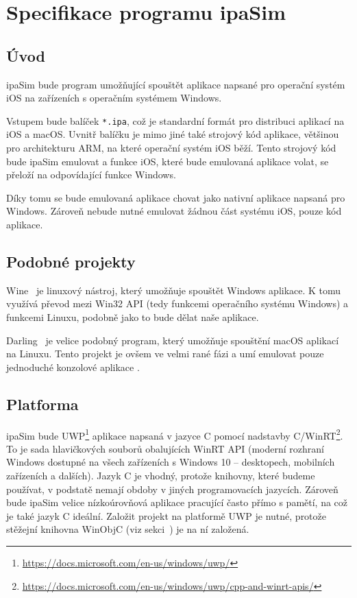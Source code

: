 \documentclass[12pt]{article}
\newcommand{\Rplus}{\protect\hspace{-.1em}\protect\raisebox{.35ex}{\smaller{\smaller\textbf{+}}}}
\newcommand{\Cpp}{\mbox{C\Rplus\Rplus}\xspace}
\begin{document}
\section*{Specifikace programu ipaSim}

\subsection*{Úvod}

ipaSim bude program umožňující spouštět aplikace napsané pro operační systém iOS na zařízeních s operačním systémem Windows.

Vstupem bude balíček \texttt{*.ipa}, což je standardní formát pro distribuci aplikací na iOS a macOS.
Uvnitř balíčku je mimo jiné také strojový kód aplikace, většinou pro architekturu ARM, na které operační systém iOS běží.
Tento strojový kód bude ipaSim emulovat a funkce iOS, které bude emulovaná aplikace volat, se přeloží na odpovídající funkce Windows.

Díky tomu se bude emulovaná aplikace chovat jako nativní aplikace napsaná pro Windows.
Zároveň nebude nutné emulovat žádnou část systému iOS, pouze kód aplikace.

\subsection*{Podobné projekty}

Wine~\cite{wine} je linuxový nástroj, který umožňuje spouštět Windows aplikace.
K tomu využívá převod mezi Win32 API (tedy funkcemi operačního systému Windows) a funkcemi Linuxu, podobně jako to bude dělat naše aplikace.

Darling~\cite{darling} je velice podobný program, který umožňuje spouštění macOS aplikací na Linuxu.
Tento projekt je ovšem ve velmi rané fázi a umí emulovat pouze jednoduché konzolové aplikace \cite{darlingStatus}.

\subsection*{Platforma}

ipaSim bude UWP\footnote{\url{https://docs.microsoft.com/en-us/windows/uwp/}} aplikace napsaná v jazyce \Cpp pomocí nadstavby \Cpp/WinRT\footnote{\url{https://docs.microsoft.com/en-us/windows/uwp/cpp-and-winrt-apis/}}.
To je sada hlavičkových souborů obalujících WinRT API (moderní rozhraní Windows dostupné na všech zařízeních s Windows 10 -- desktopech, mobilních zařízeních a dalších).
Jazyk \Cpp je vhodný, protože knihovny, které budeme používat, v podstatě nemají obdoby v jiných programovacích jazycích.
Zároveň bude ipaSim velice nízkoúrovňová aplikace pracující často přímo s pamětí, na což je také jazyk \Cpp ideální.
Založit projekt na platformě UWP je nutné, protože stěžejní knihovna WinObjC (viz sekci~) je na ní založená.
\end{document}

